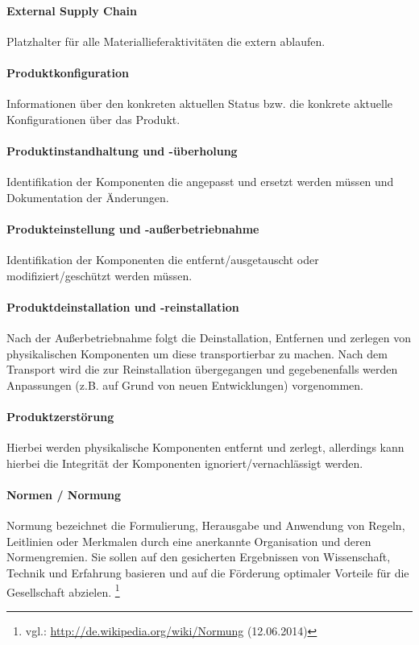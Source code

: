 \paragraph{External Supply Chain}
Platzhalter für alle Materiallieferaktivitäten die extern ablaufen.

\paragraph{Produktkonfiguration}
Informationen über den konkreten aktuellen Status bzw. die konkrete aktuelle Konfigurationen über das Produkt.

\paragraph{Produktinstandhaltung und -überholung}
Identifikation der Komponenten die angepasst und ersetzt werden müssen und Dokumentation der Änderungen.

\paragraph{Produkteinstellung und -außerbetriebnahme}
Identifikation der Komponenten die entfernt/ausgetauscht oder modifiziert/geschützt werden müssen. 

\paragraph{Produktdeinstallation und -reinstallation}
Nach der Außerbetriebnahme folgt die Deinstallation, Entfernen und zerlegen von physikalischen Komponenten um diese transportierbar zu machen. Nach dem Transport wird die zur Reinstallation übergegangen und gegebenenfalls werden Anpassungen (z.B. auf Grund von neuen Entwicklungen) vorgenommen. 

\paragraph{Produktzerstörung}
Hierbei werden physikalische Komponenten entfernt und zerlegt, allerdings kann hierbei die Integrität der Komponenten ignoriert/vernachlässigt werden. 

\paragraph{Normen / Normung}
Normung bezeichnet die Formulierung, Herausgabe und Anwendung von Regeln, Leitlinien oder Merkmalen durch eine anerkannte Organisation und deren Normengremien. Sie sollen auf den gesicherten Ergebnissen von Wissenschaft, Technik und Erfahrung basieren und auf die Förderung optimaler Vorteile für die Gesellschaft abzielen. \footnote{vgl.: \url{http://de.wikipedia.org/wiki/Normung} (12.06.2014)}

